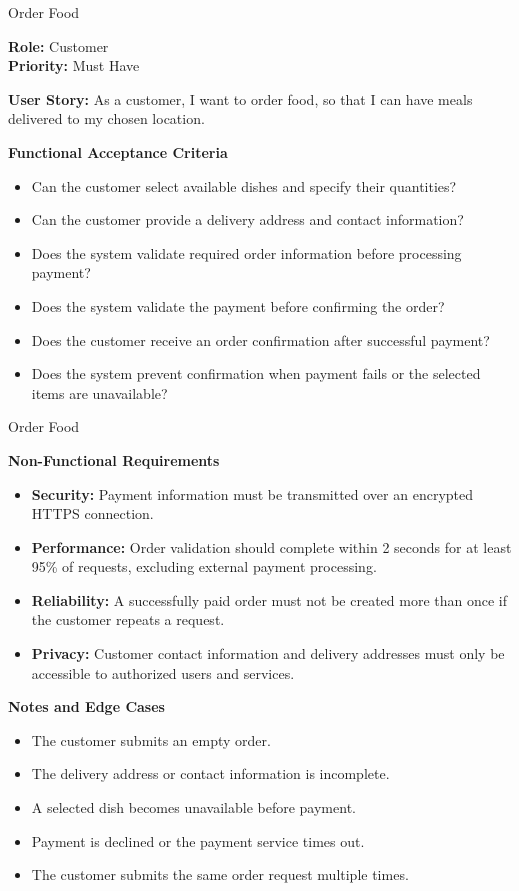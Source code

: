 
\begin{frame}{Order Food}

\noindent\textbf{Role:} Customer\\
\textbf{Priority:} Must Have

\textbf{User Story:} As a customer, I want to order food, so that I can have meals delivered to my chosen location.

\textbf{Functional Acceptance Criteria}
\begin{itemize}
  \item Can the customer select available dishes and specify their quantities?
  \item Can the customer provide a delivery address and contact information?
  \item Does the system validate required order information before processing payment?
  \item Does the system validate the payment before confirming the order?
  \item Does the customer receive an order confirmation after successful payment?
  \item Does the system prevent confirmation when payment fails or the selected items are unavailable?
\end{itemize}

\end{frame}

\begin{frame}{Order Food}

\textbf{Non-Functional Requirements}
\begin{itemize}
  \item \textbf{Security:} Payment information must be transmitted over an encrypted HTTPS connection.
  \item \textbf{Performance:} Order validation should complete within 2 seconds for at least 95\% of requests, excluding external payment processing.
  \item \textbf{Reliability:} A successfully paid order must not be created more than once if the customer repeats a request.
  \item \textbf{Privacy:} Customer contact information and delivery addresses must only be accessible to authorized users and services.
\end{itemize}

\textbf{Notes and Edge Cases}
\begin{itemize}
  \item The customer submits an empty order.
  \item The delivery address or contact information is incomplete.
  \item A selected dish becomes unavailable before payment.
  \item Payment is declined or the payment service times out.
  \item The customer submits the same order request multiple times.
\end{itemize}

\end{frame}
